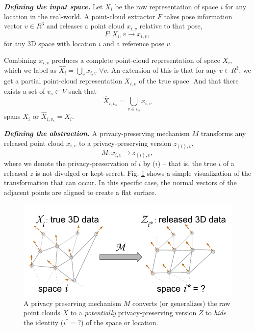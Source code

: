 \emph{\textbf{Defining the input space.}} Let $X_i$ be the raw representation of space $i$ for any location in the real-world. A point-cloud extractor $F$ takes pose information vector $v \in R^3$ and releases a point cloud $x_{i,v}$ relative to that pose,
\begin{equation}
F : X_i,v \rightarrow x_{i,v},
\end{equation}
for any 3D space with location $i$ and a reference pose $v$.

Combining $x_{i,v}$ produces a complete point-cloud representation of space $X_i$, which we label as $\hat{X_i} = \bigcup_{v} x_{i,v}$ $\forall v$. An extension of this is that for any $v \in R^3$, we get a partial point-cloud representation $X_{i,v}$ of the true space. And that there exists a set of $v_s \subset V $ such that
\begin{equation}
	\hat{X}_{i,v_s} = \bigcup_{v \in v_s} x_{i,v}
	\label{eq:span-x}
\end{equation}
 spans $X_i$ or $\hat{X}_{i,v_s}=X_i$.

\emph{\textbf{Defining the abstraction.}} A privacy-preserving mechanism $M$ transforms any released point cloud $x_{i,v}$ to a privacy-preserving version $z_{(i),v}$,
\begin{equation}
M : x_{i,v}  \rightarrow z_{(i),v},
\end{equation}
where we denote the privacy-preservation of $i$ by ($i$) -- that is, the true $i$ of a released $z$ is not divulged or kept secret. Fig. \ref{fig:3D-privacy-problem} shows a simple visualization of the transformation that can occur. In this specific case, the normal vectors of the adjacent points are aligned to create a flat surface.

\begin{figure}[t!]
	\centering
	\includegraphics[width=0.7\columnwidth]{figures/3D_data_points}%
	\vspace{-2mm}
	\caption{\small{A privacy preserving mechanism $M$ converts (or generalizes) the raw point clouds $X$ to a \textit{potentially} privacy-preserving version $Z$ to \textit{hide} the identity ($i^* = ?$) of the space or location.}}
	\vspace{-2mm}
	\label{fig:3D-privacy-problem}
\end{figure}

